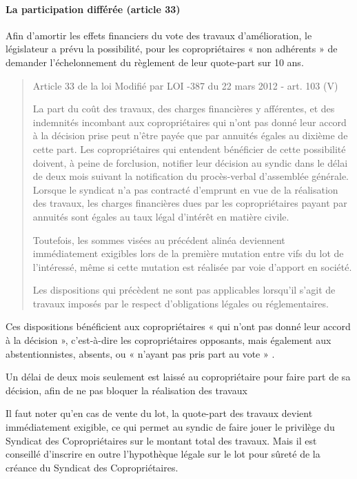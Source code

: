 			\paragraph{La participation différée (article 33)}
			
				Afin d’amortir les effets financiers du vote des travaux d’amélioration, le législateur a prévu la possibilité, pour les copropriétaires « non adhérents » de demander l’échelonnement du règlement de leur quote-part sur 10 ans.
				
				\begin{quote}
					Article 33 de la loi Modifié par LOI -387 du 22 mars 2012 - art. 103 (V)
					
					La part du coût des travaux, des charges financières y afférentes, et des indemnités incombant aux copropriétaires qui n'ont pas donné leur accord à la décision prise peut n'être payée que par annuités égales au dixième de cette part. Les copropriétaires qui entendent bénéficier de cette possibilité doivent, à peine de forclusion, notifier leur décision au syndic dans le délai de deux mois suivant la notification du procès-verbal d'assemblée générale. Lorsque le syndicat n'a pas contracté d'emprunt en vue de la réalisation des travaux, les charges financières dues par les copropriétaires payant par annuités sont égales au taux légal d'intérêt en matière civile.
					
					Toutefois, les sommes visées au précédent alinéa deviennent immédiatement exigibles lors de la première mutation entre vifs du lot de l'intéressé, même si cette mutation est réalisée par voie d'apport en société.
					
					Les dispositions qui précèdent ne sont pas applicables lorsqu'il s'agit de travaux imposés par le respect d'obligations légales ou réglementaires.
				\end{quote}
				
				Ces dispositions bénéficient aux copropriétaires « qui n’ont pas donné leur accord à la décision », c’est-à-dire les copropriétaires opposants, mais également aux abstentionnistes, absents, ou « n’ayant pas pris part au vote » .
				
				Un délai de deux mois seulement est laissé au copropriétaire pour faire part de sa décision, afin de ne pas bloquer la réalisation des travaux
				
				Il faut noter qu’en cas de vente du lot, la quote-part des travaux devient immédiatement exigible, ce qui permet au syndic de faire jouer le privilège du Syndicat des Copropriétaires sur le montant total des travaux. Mais il est conseillé d’inscrire en outre l’hypothèque légale sur le lot pour sûreté de la créance du Syndicat des Copropriétaires.
				
